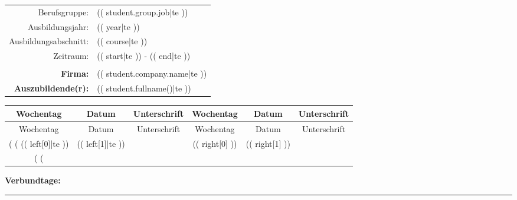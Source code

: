 \documentclass[a4paper]{scrartcl}
\begin{document}
\begin{table}
	\centering
	\begin{tabular}{rl}
	Berufsgruppe: & (( student.group.job|te ))\\
    Ausbildungsjahr: & (( year|te ))\\
	Ausbildungsabschnitt: & (( course|te ))\\
    Zeitraum: & (( start|te )) - (( end|te ))\\
	& \\
	\textbf{Firma:} & (( student.company.name|te ))\\
    \textbf{Auszubildende(r):} & (( student.fullname()|te ))\\
	\end{tabular}
\end{table}

\Large
\centering

\begin{longtable}{cccccc}
	Wochentag & Datum & Unterschrift & Wochentag & Datum & Unterschrift\\
	\hline
	\endfirsthead
	Wochentag & Datum & Unterschrift & Wochentag & Datum & Unterschrift\\
	\hline
	\endhead
    (%
        (%
        (( left[0]|te )) & (( left[1]|te )) & & (( right[0] ))& (( right[1] )) & \\
        \cline{3-3}\cline{6-6}
    	(%
        \pagebreak
    (%
\end{longtable}
\textbf{Verbundtage:} \rule{2cm}{0.4pt}
\end{document}
